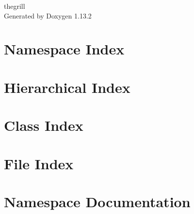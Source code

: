 \documentclass[twoside]{book}
\newcommand{\+}{\discretionary{\mbox{\scriptsize$\hookleftarrow$}}{}{}}
\newcommand{\clearemptydoublepage}{%
    \newpage{\pagestyle{empty}\cleardoublepage}%
  }
\begin{document}
  \raggedbottom
    \hypersetup{pageanchor=false,
                bookmarksnumbered=true,
                pdfencoding=unicode
               }
  \begin{titlepage}
  \vspace*{7cm}
  \begin{center}%
  {\Large thegrill}\\
  \vspace*{1cm}
  {\large Generated by Doxygen 1.13.2}\\
  \end{center}
  \end{titlepage}
  \clearemptydoublepage
  \tableofcontents
  \clearemptydoublepage
  \hypersetup{pageanchor=true}
\chapter{Namespace Index}

\chapter{Hierarchical Index}

\chapter{Class Index}

\chapter{File Index}

\chapter{Namespace Documentation}


\end{document}

